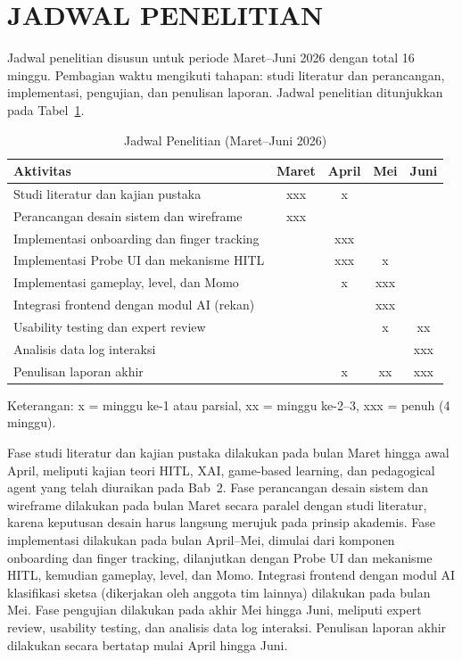\documentclass[12pt,oneside]{report}
\begin{document}
\section{JADWAL PENELITIAN}
\label{sec:jadwal-penelitian}

Jadwal penelitian disusun untuk periode Maret--Juni 2026 dengan total 16 minggu. Pembagian waktu mengikuti tahapan: studi literatur dan perancangan, implementasi, pengujian, dan penulisan laporan. Jadwal penelitian ditunjukkan pada Tabel~\ref{tab:jadwal-penelitian}.

\begin{table}[H]
\centering
\caption{Jadwal Penelitian (Maret--Juni 2026)}
\label{tab:jadwal-penelitian}
\begin{tabular}{|l|c|c|c|c|}
\hline
\textbf{Aktivitas} & \textbf{Maret} & \textbf{April} & \textbf{Mei} & \textbf{Juni} \\ \hline
Studi literatur dan kajian pustaka & xxx & x & & \\ \hline
Perancangan desain sistem dan wireframe & xxx & & & \\ \hline
Implementasi onboarding dan finger tracking & & xxx & & \\ \hline
Implementasi Probe UI dan mekanisme HITL & & xxx & x & \\ \hline
Implementasi gameplay, level, dan Momo & & x & xxx & \\ \hline
Integrasi frontend dengan modul AI (rekan) & & & xxx & \\ \hline
Usability testing dan expert review & & & x & xx \\ \hline
Analisis data log interaksi & & & & xxx \\ \hline
Penulisan laporan akhir & & x & xx & xxx \\ \hline
\end{tabular}
\end{table}

Keterangan: x = minggu ke-1 atau parsial, xx = minggu ke-2--3, xxx = penuh (4 minggu).

Fase studi literatur dan kajian pustaka dilakukan pada bulan Maret hingga awal April, meliputi kajian teori HITL, XAI, game-based learning, dan pedagogical agent yang telah diuraikan pada Bab~2. Fase perancangan desain sistem dan wireframe dilakukan pada bulan Maret secara paralel dengan studi literatur, karena keputusan desain harus langsung merujuk pada prinsip akademis. Fase implementasi dilakukan pada bulan April--Mei, dimulai dari komponen onboarding dan finger tracking, dilanjutkan dengan Probe UI dan mekanisme HITL, kemudian gameplay, level, dan Momo. Integrasi frontend dengan modul AI klasifikasi sketsa (dikerjakan oleh anggota tim lainnya) dilakukan pada bulan Mei. Fase pengujian dilakukan pada akhir Mei hingga Juni, meliputi expert review, usability testing, dan analisis data log interaksi. Penulisan laporan akhir dilakukan secara bertatap mulai April hingga Juni.
\end{document}
